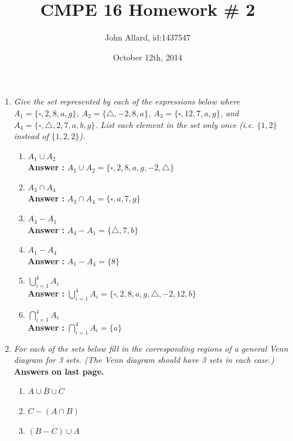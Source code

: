 \documentclass[a4paper,11pt]{article}
\title{ CMPE 16 Homework \# 2}
\author{John Allard, id:1437547}
\date{October 12th, 2014}
\begin{document}
\maketitle


\begin{enumerate}


\item \emph{Give the set represented by each of the expressions below where  $A_1 = \{ \square, 2, 8, a, g \}$,
$A_2 = \{\triangle, -2, 8, a\}$, $A_3 = \{\square, 12, 7, a, g\}$, and $A_4 = \{\square,\triangle,  2, 7, a, b, g\}$. List each element in the set only once (i.e. $\{1, 2\}$ instead of $\{1, 2, 2 \}$).}

  \begin{enumerate}
  \item $A_1 \cup A_2$ \\
  \textbf{Answer :} $A_1 \cup A_2 = \{\square, 2, 8, a, g, -2, \triangle \}$
  \item $A_3 \cap A_4$ \\
  \textbf{Answer :} $A_3 \cap A_4 = \{\square, a, 7, g \}$
  \item $A_4 - A_1$ \\
  \textbf{Answer :} $A_4 - A_1 = \{ \triangle, 7, b \}$
  \item $A_1 - A_4$ \\
  \textbf{Answer :} $A_1 - A_4 = \{ 8 \}$
  \item $\bigcup_{i=1}^{4} A_i$ \\
  \textbf{Answer :} $\bigcup_{i=1}^{4} A_i = \{ \square, 2, 8, a, g, \triangle, -2, 12, b  \}$
  \item $\bigcap_{i=1}^{4} A_i$ \\
  \textbf{Answer :} $\bigcap_{i=1}^{4} A_i = \{ a  \}$
  \end{enumerate}



\item \emph{For each of the sets below fill in the corresponding regions of a general Venn diagram for
3 sets. (The Venn diagram should have 3 sets in each case.)}
 \textbf{Answers on last page.}
  \begin{enumerate}
  \item $A \cup \overline{B} \cup C$ 
  \item $C - ( A \cap B)$
  \item $\overline{(B - C) \cup A} $
  \end{enumerate}



\end{enumerate}
\end{document}
